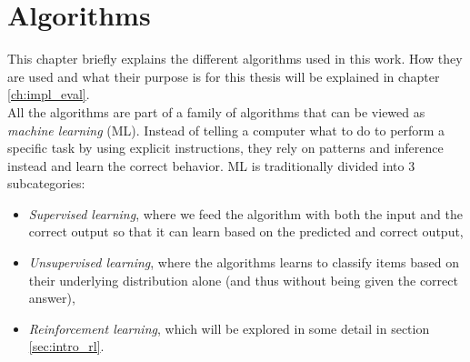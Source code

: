 \chapter{Algorithms}
\label{ch:algorithms}

This chapter briefly explains the different algorithms used in this work. How they are used and what their purpose is for this thesis will be explained in chapter \ref{ch:impl_eval}.\\
All the algorithms are part of a family of algorithms that can be viewed as \emph{machine learning} (ML). Instead of telling a computer what to do to perform a specific task by using explicit instructions, they rely on patterns and inference instead and learn the correct behavior. ML is traditionally divided into 3 subcategories:
\begin{itemize}
    \item \emph{Supervised learning}, where we feed the algorithm with both the input and the correct output so that it can learn based on the predicted and correct output,
    \item \emph{Unsupervised learning}, where the algorithms learns to classify items based on their underlying distribution alone (and thus without being given the correct answer),
    \item \emph{Reinforcement learning}, which will be explored in some detail in section \ref{sec:intro_rl}.
\end{itemize}


